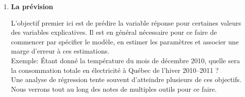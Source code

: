 \begin{enumerate}
\item \textbf{La prévision}

L'objectif premier ici est de prédire la variable réponse pour certaines valeurs des variables explicatives. Il est en général nécessaire pour ce faire de commencer par spécifier le modèle, en estimer les paramètres et associer une marge d'erreur à ces estimations.\\
Exemple: \'Etant donn\'e la température du mois de décembre 2010, quelle sera la consommation totale en électricité à Québec de l'hiver 2010--2011 ?\\

Une analyse de régression tente souvent d'atteindre plusieurs de ces objectifs. Nous verrons tout au long des notes de multiples outils pour ce faire.

\end{enumerate}

